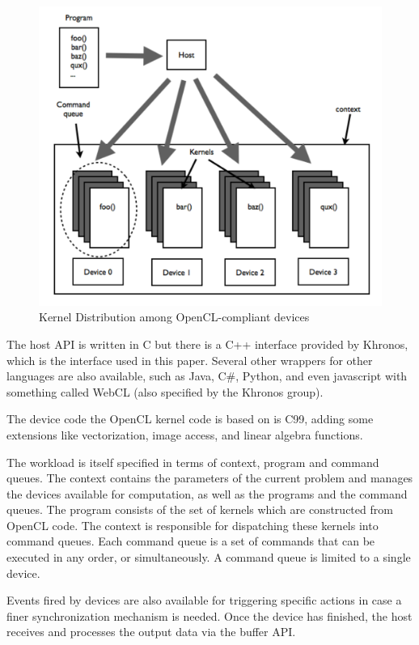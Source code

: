 \begin{figure}
\caption{Kernel Distribution among OpenCL-compliant devices\cite{OpenCLInAction}}
\centering
\includegraphics[scale=0.5]{OpenCL_Objects.pdf}
\end{figure}

The host \gls{API} is written in C but there is a C++ interface provided by Khronos, which is the interface used in this paper. Several other wrappers for other languages are also available, such as Java, C\#, Python, and even javascript with something called WebCL (also specified by the Khronos group). 

The device code the \gls{OpenCL} kernel code is based on is C99, adding some extensions like vectorization, image access, and linear algebra functions.

The workload is itself specified in terms of context, program and command queues. The context contains the parameters of the current problem and manages the devices available for computation, as well as the programs and the command queues. The program consists of the set of kernels which are constructed from \gls{OpenCL} code. The context is responsible for dispatching these kernels into command queues. Each command queue is a set of commands that can be executed in any order, or simultaneously. A command queue is limited to a single device.

Events fired by devices are also available for triggering specific actions in case a finer synchronization mechanism is needed. Once the device has finished, the host receives and processes the output data via the buffer \gls{API}.

